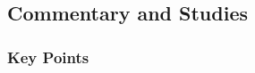 

	
	
	
	
\subsection{Commentary and Studies} %
	\label{ATONEMENT-COMMENTARY}
	
	\subsubsection{Key Points}
		\label{ATONEMENT-KEYS}
	
